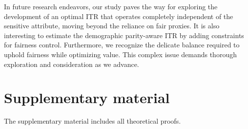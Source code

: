 \documentclass[12pt]{article}
\theoremstyle{plain}
\theoremstyle{definition}
\theoremstyle{remark}
\begin{document}
In future research endeavors, our study paves the way for exploring the development of an optimal ITR that operates completely independent of the sensitive attribute, moving beyond the reliance on fair proxies. It is also interesting to estimate the demographic parity-aware ITR by adding  constraints for fairness control.
Furthermore, we recognize  the delicate balance required to uphold fairness while optimizing value. This complex issue demands thorough exploration and consideration as we advance.



\section*{Supplementary material}
The supplementary material includes all theoretical proofs.

%


\end{document}
